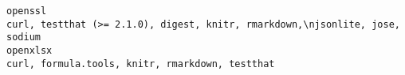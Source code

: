 \documentclass[
  letterpaper,
  DIV=11,
  numbers=noendperiod]{scrreprt}
\begin{document}
\begin{verbatim}
openssl                                                                                                                                                                                                                                                                                                                                                                                                                                                                                                                                                                                                                                                                                                                                                                                                                                                                                                                                                                                                                                                                                                                                                                                                                          curl, testthat (>= 2.1.0), digest, knitr, rmarkdown,\njsonlite, jose, sodium
openxlsx                                                                                                                                                                                                                                                                                                                                                                                                                                                                                                                                                                                                                                                                                                                                                                                                                                                                                                                                                                                                                                                                                                                                                                                                                                                      curl, formula.tools, knitr, rmarkdown, testthat

\end{verbatim}
\end{document}
